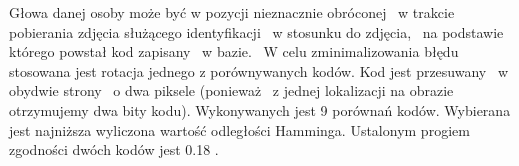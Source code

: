 Głowa danej osoby może być w pozycji nieznacznie obróconej ~w trakcie pobierania zdjęcia służącego identyfikacji ~w stosunku do zdjęcia, ~na podstawie  którego powstał kod zapisany  ~w bazie. ~W celu zminimalizowania błędu stosowana jest rotacja jednego z porównywanych kodów. Kod jest przesuwany ~w obydwie strony ~o dwa piksele (ponieważ ~z jednej lokalizacji na obrazie otrzymujemy dwa bity kodu). Wykonywanych jest 9 porównań kodów. Wybierana jest najniższa wyliczona wartość odległości Hamminga. Ustalonym progiem zgodności dwóch kodów jest 0.18 \cite{Daugman}.

